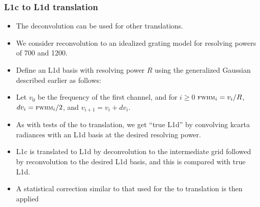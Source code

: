 \documentclass[10pt]{beamer}
\begin{document}
\begin{frame}
\begin{columns}[t]
\begin{column}{0.5\textwidth}
\end{column}
\end{columns}
\end{frame}
\begin{frame}
\frametitle{L1c to L1d translation}
\begin{itemize}

  \item The {\airs} deconvolution can be used for other
    translations.

  \item We consider reconvolution to an idealized grating model for
    resolving powers of 700 and 1200.

  \item Define an {\airs} L1d basis with resolving power $R$ using
    the generalized Gaussian described earlier as follows:

  \item Let $v_0$ be the frequency of the first channel, and for
    $i\ge0$ $\mbox{\small\textsc{fwhm}}_i = v_i / R$, $dv_i = \mbox{\small\textsc{fwhm}}_i / 2$, and $v_{i+1}
    = v_i + dv_i$.

  \item As with tests of the {\airs} to {\cris} translation, we get
    ``true L1d'' by convolving kcarta radiances with an L1d basis at
    the desired resolving power.

  \item {\airs} L1c is translated to L1d by deconvolution to the
    intermediate grid followed by reconvolution to the desired L1d
    basis, and this is compared with true L1d.

  \item A statistical correction similar to that used for the
    {\airs} to {\cris} translation is then applied

\end{itemize}
\end{frame}
\end{document}
